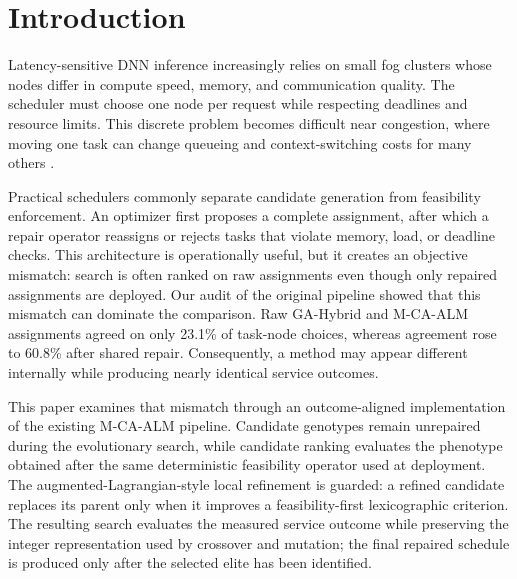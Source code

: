 \documentclass[pdflatex,sn-mathphys-num]{sn-jnl}
\begin{document}
\section{Introduction}

Latency-sensitive DNN inference increasingly relies on small fog clusters whose nodes differ in compute speed, memory, and communication quality. The scheduler must choose one node per request while respecting deadlines and resource limits. This discrete problem becomes difficult near congestion, where moving one task can change queueing and context-switching costs for many others \cite{Mao2017}.

Practical schedulers commonly separate candidate generation from feasibility enforcement. An optimizer first proposes a complete assignment, after which a repair operator reassigns or rejects tasks that violate memory, load, or deadline checks. This architecture is operationally useful, but it creates an objective mismatch: search is often ranked on raw assignments even though only repaired assignments are deployed. Our audit of the original pipeline showed that this mismatch can dominate the comparison. Raw GA-Hybrid and M-CA-ALM assignments agreed on only 23.1\% of task-node choices, whereas agreement rose to 60.8\% after shared repair. Consequently, a method may appear different internally while producing nearly identical service outcomes.

This paper examines that mismatch through an outcome-aligned implementation of the existing M-CA-ALM pipeline. Candidate genotypes remain unrepaired during the evolutionary search, while candidate ranking evaluates the phenotype obtained after the same deterministic feasibility operator used at deployment. The augmented-Lagrangian-style local refinement is guarded: a refined candidate replaces its parent only when it improves a feasibility-first lexicographic criterion. The resulting search evaluates the measured service outcome while preserving the integer representation used by crossover and mutation; the final repaired schedule is produced only after the selected elite has been identified.
\end{document}
